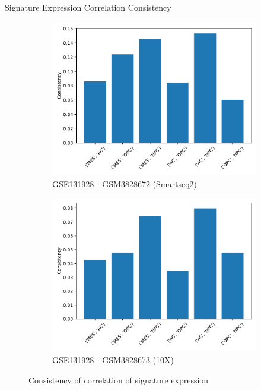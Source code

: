 \documentclass[aspectratio=169,9pt]{beamer}
\begin{document}
    \begin{frame}{Signature Expression Correlation Consistency}
        \begin{adjustwidth}{-5cm}{-5cm}
            \centering
            \begin{figure}
                \centering
                \begin{subfigure}[b]{0.38\textwidth}
                    \centering
                    \includegraphics[width=\textwidth]{GSM3828672_Consistency}
                    \caption{GSE131928 - GSM3828672 (Smartseq2)}
                \end{subfigure}
                \begin{subfigure}[b]{0.38\textwidth}
                    \centering
                    \includegraphics[width=\textwidth]{GSM3828673_Consistency}
                    \caption{GSE131928 - GSM3828673 (10X)}
                \end{subfigure}
                \caption{Consistency of correlation of signature expression}
            \end{figure}
        \end{adjustwidth}
    \end{frame}
\end{document}
